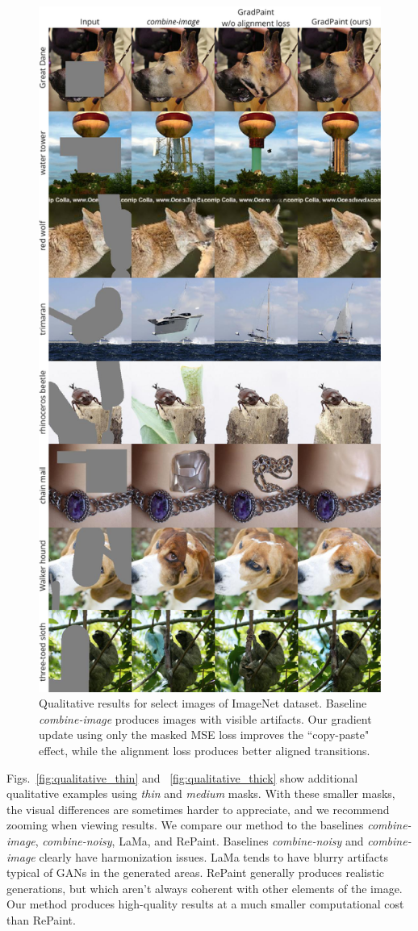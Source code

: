   
  \begin{figure}[H]
    \centering
    \includegraphics[width=0.75\linewidth]{images/gradpaint/vis_ablation.pdf}
    \caption{Qualitative results for select images of ImageNet dataset. Baseline \emph{combine-image} produces  images with visible artifacts. Our gradient update using only the masked MSE loss improves the ``copy-paste" effect, while the alignment loss produces better aligned transitions.}
    \label{fig:vis_ablation}
  \end{figure}



Figs.~\ref{fig:qualitative_thin} and ~\ref{fig:qualitative_thick} show additional qualitative examples using
\emph{thin} and \emph{medium} masks. With these smaller masks, the visual differences are sometimes harder to 
appreciate, and we recommend zooming when viewing results. We compare our method to the baselines 
\emph{combine-image}, \emph{combine-noisy}, LaMa, and RePaint. Baselines \emph{combine-noisy} and
 \emph{combine-image} clearly have harmonization issues. LaMa tends to have blurry artifacts typical of
  GANs in the generated areas. RePaint generally produces realistic generations, but which aren't always
   coherent with other elements of the image. Our method produces high-quality results at a much smaller
    computational cost than RePaint.


